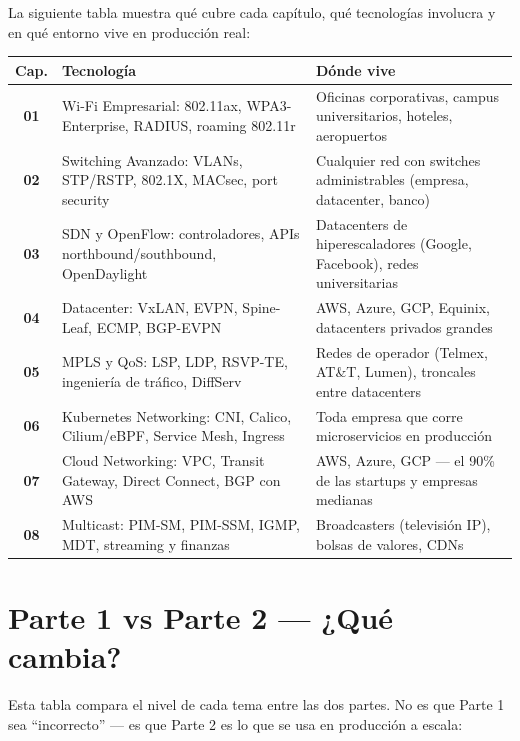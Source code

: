 La siguiente tabla muestra qué cubre cada capítulo, qué tecnologías
involucra y en qué entorno vive en producción real:

\begin{center}
\renewcommand{\arraystretch}{1.4}
\begin{tabular}{>{\bfseries}c p{4.5cm} p{5.5cm}}
\toprule
\textbf{Cap.} & \textbf{Tecnología} & \textbf{Dónde vive} \\
\midrule
01 & Wi-Fi Empresarial: 802.11ax, WPA3-Enterprise, RADIUS, roaming 802.11r
   & Oficinas corporativas, campus universitarios, hoteles, aeropuertos \\
02 & Switching Avanzado: VLANs, STP/RSTP, 802.1X, MACsec, port security
   & Cualquier red con switches administrables (empresa, datacenter, banco) \\
03 & SDN y OpenFlow: controladores, APIs northbound/southbound, OpenDaylight
   & Datacenters de hiperescaladores (Google, Facebook), redes universitarias \\
04 & Datacenter: VxLAN, EVPN, Spine-Leaf, ECMP, BGP-EVPN
   & AWS, Azure, GCP, Equinix, datacenters privados grandes \\
05 & MPLS y QoS: LSP, LDP, RSVP-TE, ingeniería de tráfico, DiffServ
   & Redes de operador (Telmex, AT\&T, Lumen), troncales entre datacenters \\
06 & Kubernetes Networking: CNI, Calico, Cilium/eBPF, Service Mesh, Ingress
   & Toda empresa que corre microservicios en producción \\
07 & Cloud Networking: VPC, Transit Gateway, Direct Connect, BGP con AWS
   & AWS, Azure, GCP --- el 90\% de las startups y empresas medianas \\
08 & Multicast: PIM-SM, PIM-SSM, IGMP, MDT, streaming y finanzas
   & Broadcasters (televisión IP), bolsas de valores, CDNs \\
\bottomrule
\end{tabular}
\end{center}

\section{ Parte 1 vs Parte 2 --- ¿Qué cambia?}

Esta tabla compara el nivel de cada tema entre las dos partes.
No es que Parte 1 sea ``incorrecto'' --- es que Parte 2 es lo que
se usa en producción a escala:

